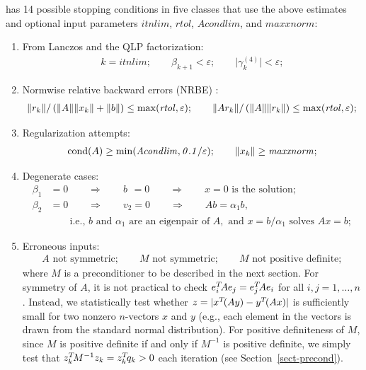 \documentclass{doc_acmtrans2m}
\begin{document}
\MINRESQLP has 14 possible stopping conditions in five classes that
use the above estimates and optional input parameters
$\mathit{itnlim}$, $\mathit{rtol}$, $\mathit{Acondlim}$, and
$\mathit{maxxnorm}$:
\begin{enumerate}[\upshape (C1)]
\item From Lanczos and the QLP factorization:  \label{C1}
\begin{align*}
  k = \mathit{itnlim};
  \qquad
  \beta_{k+1} < \varepsilon;
  \qquad
  \bigl| \gamma_k^{(4)} \bigr| < \varepsilon;
\end{align*}
\item Normwise relative backward errors (NRBE) \cite{PS02}: \label{C2}
\begin{align*}
  \norm{r_k}  / \left( \norm{A} \norm{x_k} + \norm{b} \right)
              \le \max(\mathit{rtol},\varepsilon);
  \qquad
  \norm{A r_k} / \left( \norm{A} \norm{r_k} \right)
              \le \max(\mathit{rtol},\varepsilon);
\end{align*}
\item Regularization attempts: \label{C3}
\begin{align*}
  \cond(A) \ge \mathit{\min(Acondlim,0.1/\varepsilon)};
  \qquad
  \norm{x_k}  \ge \mathit{maxxnorm};
\end{align*}
\item Degenerate cases: \label{C4}
\begin{align*}
   \beta_1 &=0  \qquad \Rightarrow \qquad b\phantom{_2}=0 \qquad  \Rightarrow
                \qquad x=0 \mbox{ is the solution};
\\ \beta_2 &=0  \qquad \Rightarrow \qquad v_2=0
                \qquad \Rightarrow \qquad A b = \alpha_1 b,
\\         &    \qquad \mbox{i.e., } b \mbox{ and } \alpha_1
                \mbox{ are an eigenpair of } A,
                \mbox{ and } x=b/\alpha_1\mbox{ solves } A x=b;
\end{align*}
\item Erroneous inputs: \label{C5}
\begin{align*}
    A \mbox{ not symmetric}; \qquad
    M \mbox{ not symmetric}; \qquad 
    M \mbox{ not positive definite};
\end{align*}
where $M$ is a preconditioner to be described in the next section. For
symmetry of $A$, it is not practical to check $e_i\T A e_j = e_j\T A
e_i$ for all $i,j=1,\dots,n$. Instead, we statistically test whether
$z=|x\T(Ay)-y\T(Ax)|$ is sufficiently small for two nonzero
$n$-vectors $x$ and $y$ (e.g., each element in the vectors is drawn
from the standard normal distribution).  For positive definiteness of
$M$, since $M$ is positive definite if and only if $M^{-1}$ is
positive definite, we simply test that $z_k\T M^{-1} z_k = z_k\T q_k >
0$ each iteration (see Section~\ref{sect-precond}).
\end{enumerate}
\end{document}
